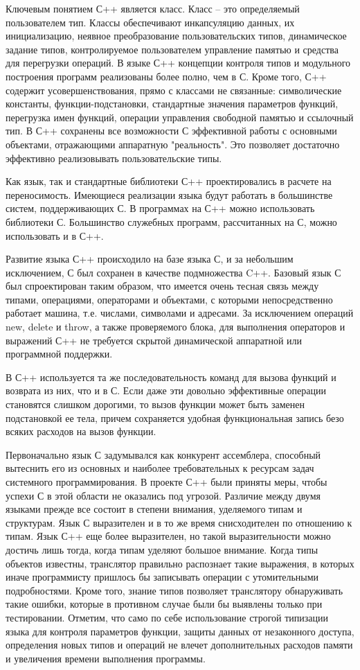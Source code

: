 Ключевым понятием С++ является класс. Класс -- это определяемый пользователем тип. Классы обеспечивают инкапсуляцию данных, их инициализацию, неявное преобразование пользовательских типов, динамическое задание типов, контролируемое пользователем управление памятью и средства для перегрузки операций. В языке С++ концепции контроля типов и модульного построения программ реализованы более полно, чем в С. Кроме того, С++ содержит усовершенствования, прямо с классами не связанные: символические константы, функции-подстановки, стандартные значения параметров
функций, перегрузка имен функций, операции управления свободной памятью и ссылочный тип. В С++ сохранены все возможности С эффективной работы с основными объектами, отражающими аппаратную "реальность". Это позволяет достаточно эффективно реализовывать пользовательские типы.

Как язык, так и стандартные библиотеки С++ проектировались в расчете на переносимость. Имеющиеся реализации языка будут работать в большинстве систем, поддерживающих С. В программах на С++ можно использовать библиотеки С. Большинство служебных программ, рассчитанных на С, можно использовать и в С++.

Развитие языка С++ происходило на базе языка С, и за небольшим исключением, С был сохранен в качестве подмножества C++. Базовый язык С был спроектирован таким образом, что имеется очень тесная связь между типами, операциями, операторами и объектами, с которыми непосредственно работает машина, т.е. числами, символами и адресами. За исключением операций new, delete и throw, а также проверяемого блока, для выполнения операторов и выражений С++ не требуется скрытой динамической аппаратной или программной поддержки.

В С++ используется та же последовательность команд для вызова функций и возврата из них, что и в С. Если даже эти довольно эффективные операции становятся слишком дорогими, то вызов функции может быть заменен подстановкой ее тела, причем сохраняется удобная функциональная запись безо всяких расходов на вызов функции.

Первоначально язык С задумывался как конкурент ассемблера, способный вытеснить его из основных и наиболее требовательных к ресурсам задач системного программирования. В проекте С++ были приняты меры, чтобы успехи С в этой области не оказались под угрозой. Различие между двумя языками прежде все состоит в степени внимания, уделяемого типам и структурам. Язык С выразителен и в то же время снисходителен по отношению к типам. Язык С++ еще более выразителен, но такой выразительности можно достичь лишь тогда, когда типам уделяют большое внимание. Когда типы объектов известны, транслятор правильно распознает такие выражения, в которых иначе программисту пришлось бы записывать операции с утомительными подробностями. Кроме того, знание типов позволяет транслятору обнаруживать такие ошибки, которые в противном случае были бы выявлены только при тестировании. Отметим, что само по себе использование строгой типизации языка для контроля параметров функции, защиты данных от незаконного доступа, определения новых типов и операций не влечет дополнительных расходов памяти и увеличения времени выполнения программы.

